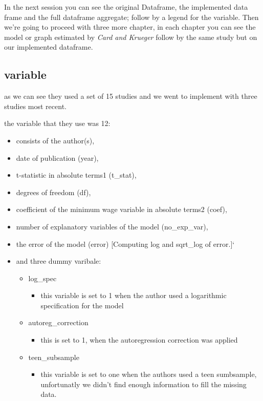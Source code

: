 \documentclass[
]{article}
\providecommand{\tightlist}{%
  \setlength{\itemsep}{0pt}\setlength{\parskip}{0pt}}
\begin{document}
In the next session you can see the original Dataframe, the implemented
data frame and the full dataframe aggregate; follow by a legend for the
variable. Then we're going to proceed with three more chapter, in each
chapter you can see the model or graph estimated by \emph{Card and
Krueger} follow by the same study but on our implemented dataframe.

\hypertarget{variable}{%
\subsection{variable}\label{variable}}

as we can see they used a set of 15 studies and we went to implement
with three studies most recent.

the variable that they use was 12:

\begin{itemize}
\tightlist
\item
  consists of the author(s),
\item
  date of publication (year),
\item
  t-statistic in absolute terms1 (t\_stat),
\item
  degrees of freedom (df),
\item
  coefficient of the minimum wage variable in absolute terms2 (coef),
\item
  number of explanatory variables of the model (no\_exp\_var),
\item
  the error of the model (error) {[}Computing log and sqrt\_log of
  error.{]}`
\item
  and three dummy varibale:

  \begin{itemize}
  \tightlist
  \item
    log\_spec

    \begin{itemize}
    \tightlist
    \item
      this variable is set to 1 when the author used a logarithmic
      specification for the model
    \end{itemize}
  \item
    autoreg\_correction

    \begin{itemize}
    \tightlist
    \item
      this is set to 1, when the autoregression correction was applied
    \end{itemize}
  \item
    teen\_subsample

    \begin{itemize}
    \tightlist
    \item
      this variable is set to one when the authors used a teen
      sumbsample, unfortunatly we didn't find enough information to fill
      the missing data.
    \end{itemize}
  \end{itemize}
\end{itemize}
\end{document}
